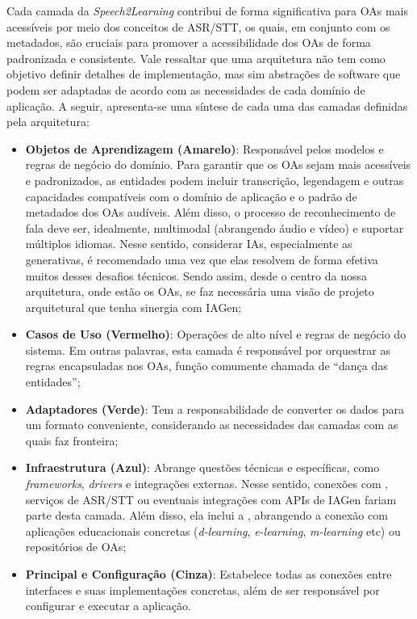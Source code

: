 Cada camada da \textit{Speech2Learning} contribui de forma significativa para OAs mais acessíveis por meio dos conceitos de ASR/STT, os quais, em conjunto com os metadados, são cruciais para promover a acessibilidade dos OAs de forma padronizada e consistente. Vale ressaltar que uma arquitetura não tem como objetivo definir detalhes de implementação, mas sim abstrações de software que podem ser adaptadas de acordo com as necessidades de cada domínio de aplicação. A seguir, apresenta-se uma síntese de cada uma das camadas definidas pela arquitetura:

\begin{itemize}
\item \textbf{Objetos de Aprendizagem (Amarelo)}: Responsável pelos modelos e regras de negócio do domínio. Para garantir que os OAs sejam mais acessíveis e padronizados, as entidades podem incluir transcrição, legendagem e outras capacidades compatíveis com o domínio de aplicação e o padrão de metadados dos OAs audíveis. Além disso, o processo de reconhecimento de fala deve ser, idealmente, multimodal (abrangendo áudio e vídeo) e suportar múltiplos idiomas. Nesse sentido, considerar IAs, especialmente as generativas, é recomendado uma vez que elas resolvem de forma efetiva muitos desses desafios técnicos. Sendo assim, desde o centro da nossa arquitetura, onde estão os OAs, se faz necessária uma visão de projeto arquitetural que tenha sinergia com IAGen;
\item \textbf{Casos de Uso (Vermelho)}: Operações de alto nível e regras de negócio do sistema. Em outras palavras, esta camada é responsável por orquestrar as regras encapsuladas nos OAs, função comumente chamada de ``dança das entidades'';
\item \textbf{Adaptadores (Verde)}: Tem a responsabilidade de converter os dados para um formato conveniente, considerando as necessidades das camadas com as quais faz fronteira;
\item \textbf{Infraestrutura (Azul)}: Abrange questões técnicas e específicas, como \textit{frameworks}, \textit{drivers} e integrações externas. Nesse sentido, conexões com , serviços de ASR/STT ou eventuais integrações com APIs de IAGen fariam parte desta camada. Além disso, ela inclui a , abrangendo a conexão com aplicações educacionais concretas (\textit{d-learning}, \textit{e-learning}, \textit{m-learning} etc) ou repositórios de OAs;
\item \textbf{Principal e Configuração (Cinza)}: Estabelece todas as conexões entre interfaces e suas implementações concretas, além de ser responsável por configurar e executar a aplicação.
\end{itemize}

